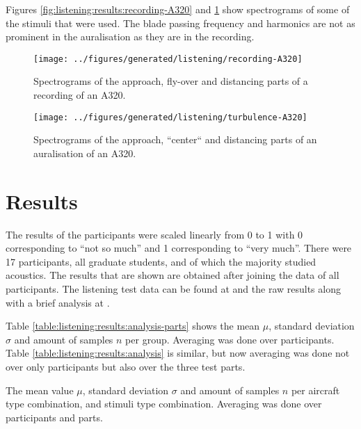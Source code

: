 Figures \ref{fig:listening:results:recording-A320} and
\ref{fig:listening:results:simulation-A320} show spectrograms of some of the stimuli
that were used. The blade passing frequency and harmonics are not as prominent
in the auralisation as they are in the recording.

\begin{figure}[H]
  \centering
  \texttt{[image: ../figures/generated/listening/recording-A320]}
  \caption{Spectrograms of the approach, fly-over and distancing parts of a recording of an A320.}
  \label{fig:listening:results:recording-A320}
%
  \centering
  \texttt{[image: ../figures/generated/listening/turbulence-A320]}
  \caption{Spectrograms of the approach, ``center`` and distancing parts of an auralisation of an A320.}
  \label{fig:listening:results:simulation-A320}
\end{figure}

\newpage
\section{Results}
The results of the participants were scaled linearly from 0 to 1 with 0
corresponding to ``not so much'' and 1 corresponding to ``very much''.
There were 17 participants, all graduate students, and of which the majority
studied acoustics. The results that are shown are obtained after joining the
data of all participants. %
The listening test data can be found at \cite{Rietdijk2017a} and the
raw results along with a brief analysis at \cite{Rietdijk2017b}.

Table \ref{table:listening:results:analysis-parts} shows the mean $\mu$,
standard deviation $\sigma$ and amount of samples $n$ per group.
Averaging was done over participants. Table \ref{table:listening:results:analysis} is similar,
but now averaging was done not over only participants but also over the three test parts.

\begin{table}[H]
  \centering
  \caption{The mean value $\mu$, standard deviation $\sigma$ and amount of samples $n$ per aircraft type combination, and stimuli type combination. Averaging was done over participants and parts.}
  \label{table:listening:results:analysis}
  
\end{table}

